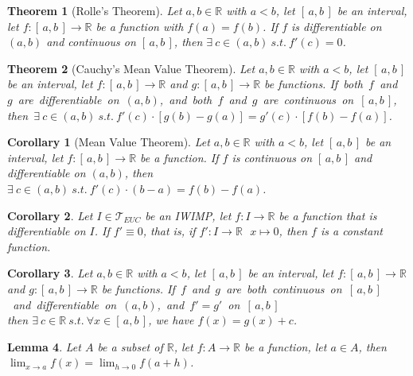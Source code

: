 \documentclass[11pt]{article}
\theoremstyle{break}
\theoremstyle{break}
\newtheorem{thm}{Theorem}[section]
\newtheorem{lem}{Lemma}[thm]
\newtheorem{corT}[lem]{Corollary}
\newcommand{\R}{\mathbb{R}}
\newcommand{\T}{\mathcal{T}}
\newcommand{\Intab}{[\,a,b\,]}
\begin{document}
	\begin{thm}[Rolle's Theorem]
		Let $a,b \in \R$ with $a<b$, let $\Intab$ be an interval, let $f: \Intab \to \R$ be a function with $f(a)=f(b)$. If $f$ is differentiable on $(a,b)$ and continuous on $\Intab$, then $\exists \ c \in (a,b) \ s.t. \ f'(c)=0$.
	\end{thm}
	
	\begin{thm}[Cauchy's Mean Value Theorem]
		Let $a,b \in \R$ with $a<b$, let $\Intab$ be an interval, let $f: \Intab \to \R$ and $g: \Intab \to \R$ be functions. \mbox{If both $f$ and $g$ are differentiable on $(a,b)$, and both $f$ and $g$ are continuous on $\Intab$,}\\ \mbox{then $\exists \ c \in (a,b) \ s.t. \ f'(c) \cdot [g(b)-g(a)]=g'(c) \cdot [f(b)-f(a)]$}.
	\end{thm}
	
	\begin{corT}[Mean Value Theorem]
		Let $a,b \in \R$ with $a<b$, let $\Intab$ be an interval, let $f: \Intab \to \R$ be a function. If $f$ is continuous on $\Intab$ and differentiable on $(a,b)$, then $\exists \ c \in (a,b) \ s.t. \ f'(c)\cdot (b-a)=f(b)-f(a)$.
	\end{corT}
	
	\begin{corT}
		Let $I \in \T_{EUC}$ be an IWIMP, let $f:I \to \R$ be a function that is differentiable on $I$. If $f' \equiv 0$, that is, if $f':I \to \R \ \ \ x \mapsto 0$, then $f$ is a constant function.
	\end{corT} 
	
	\begin{corT}
		Let $a,b \in \R$ with $a<b$, let $\Intab$ be an interval, let $f: \Intab \to \R$ and $g: \Intab \to \R$ be functions. \mbox{If $f$ and $g$ are both continuous on $\Intab$ and differentiable on $(a,b)$, and $f'=g'$ on $\Intab$}\\ then $\exists \ c \in \R \ s.t. \ \forall x \in \Intab$, we have $f(x)=g(x)+c$.
	\end{corT}
	
	\begin{lem}
		Let $A$ be a subset of $\R$, let $f:A \to \R$ be a function, let $a \in A$, then $\lim_{x \to a} f(x) = \lim_{h \to 0} f(a+h)$.
	\end{lem}
	
\end{document}
